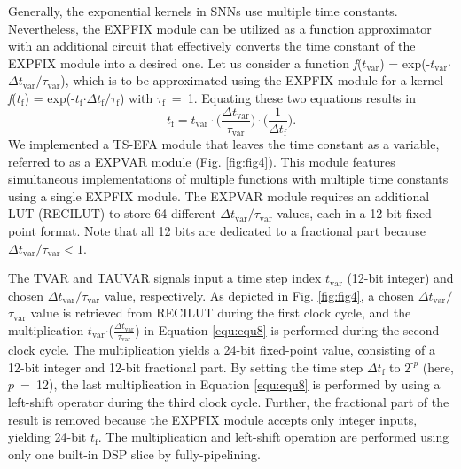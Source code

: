 \documentclass[10pt,journal]{IEEEtran}
\begin{document}
Generally, the exponential kernels in SNNs use multiple time constants. 
Nevertheless, the EXP\textunderscore FIX module can be utilized as a function approximator with an additional circuit that effectively converts the time constant of the EXP\textunderscore FIX module into a desired one. 
Let us consider a function \textit{f}($t_\textrm{var}$) = exp(-$t_\textrm{var}$$\cdot$$\Delta t_\textrm{var}$$\mathbin{/}$$\tau_\textrm{var}$), which is to be approximated using the EXP\textunderscore FIX module for a kernel \textit{f}($t_\textrm{f}$) = exp(-$t_\textrm{f}$$\cdot$$\Delta t_\textrm{f}$$\mathbin{/}$$\tau_\textrm{f}$) with $\tau_\textrm{f}$~=~1.
Equating these two equations results in
\begin{equation}\label{equ:equ8}
    t_\textrm{f} = t_\textrm{var} \cdot \Big(\frac{\Delta t_\textrm{var}}{\tau_\textrm{var}}\Big) \cdot \Big(\frac{1}{\Delta t_\textrm{f}}\Big).
\end{equation}
We implemented a TS-EFA module that leaves the time constant as a variable, referred to as a EXP\textunderscore VAR module (Fig. \ref{fig:fig4}).
This module features simultaneous implementations of multiple functions with multiple time constants using a single EXP\textunderscore FIX module. 
The EXP\textunderscore VAR module requires an additional LUT (RECI\textunderscore LUT) to store 64 different $\Delta t_\textrm{var}$$\mathbin{/}$$\tau_\textrm{var}$ values, each in a 12-bit fixed-point format. 
Note that all 12 bits are dedicated to a fractional part because $\Delta t_\textrm{var}$$\mathbin{/}$$\tau_\textrm{var}<1$.

The T\textunderscore VAR and TAU\textunderscore VAR signals input a time step index $t_{\textrm{var}}$ (12-bit integer) and chosen $\Delta t_\textrm{var}$$\mathbin{/}$$\tau_\textrm{var}$ value, respectively.
As depicted in Fig. \ref{fig:fig4}, a chosen $\Delta t_\textrm{var}$$\mathbin{/}$$\tau_\textrm{var}$ value is retrieved from RECI\textunderscore LUT during the first clock cycle, and the multiplication $t_\textrm{var}$$\cdot$\big($\frac{\Delta  t_\textrm{var}}{\tau_\textrm{var}}$\big) in Equation \eqref{equ:equ8} is performed during the second clock cycle.
The multiplication yields a 24-bit fixed-point value, consisting of a 12-bit integer and 12-bit fractional part. 
By setting the time step $\Delta t_\textrm{f}$ to $2^{\textrm{-}p}$ (here, $p$~=~12), the last multiplication in Equation \eqref{equ:equ8} is performed by using a left-shift operator during the third clock cycle. 
Further, the fractional part of the result is removed because the EXP\textunderscore FIX module accepts only integer inputs, yielding 24-bit $t_\textrm{f}$.
The multiplication and left-shift operation are performed using only one built-in DSP slice by fully-pipelining. 
\end{document}
